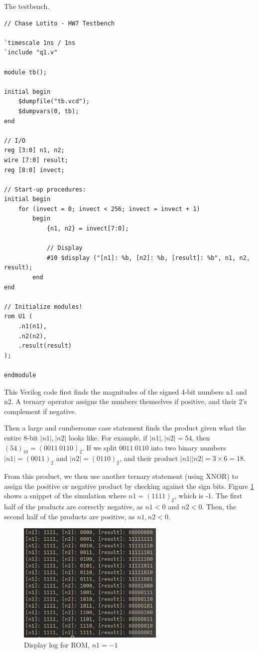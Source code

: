 \documentclass{article}
\begin{document}
The testbench.

\begin{lstlisting}
// Chase Lotito - HW7 Testbench

`timescale 1ns / 1ns
`include "q1.v"

module tb();
 
initial begin
    $dumpfile("tb.vcd");
    $dumpvars(0, tb);
end

// I/O
reg [3:0] n1, n2;
wire [7:0] result;
reg [8:0] invect;

// Start-up procedures:
initial begin  
    for (invect = 0; invect < 256; invect = invect + 1)
        begin
            {n1, n2} = invect[7:0];
            
            // Display 
            #10 $display ("[n1]: %b, [n2]: %b, [result]: %b", n1, n2, result);
        end
end

// Initialize modules!
rom U1 (
    .n1(n1),
    .n2(n2),
    .result(result)
);

endmodule
\end{lstlisting}

This Verilog code first finds the magnitudes of the signed 4-bit numbers n1 and n2. A ternary operator assigns the numbers themselves if positive, and their 2's complement if negative.

\smallskip

Then a large and cumbersome case statement finds the product given what the entire 8-bit \({|n1|, |n2|}\) looks like. For example, if \({|n1|, |n2|} = 54\), then \((54)_{10} = (0011 ~ 0110)_{2}\). If we split \(0011 ~ 0110\) into two binary numbers \(|n1| = (0011)_{2}\) and \(|n2| = (0110)_{2}\), and their product \(|n1||n2| = 3 \times 6 = 18\). 

\smallskip

From this product, we then use another ternary statement (using XNOR) to assign the positive or negative product by checking against the sign bits. Figure \ref{fig:simlog} shows a snippet of the simulation where \(n1 = (1111)_{2}\), which is -1. The first half of the products are correctly negative, as \(n1 < 0\) and \(n2 < 0\). Then, the second half of the products are positive, as \(n1, n2 < 0\).  

\begin{figure}[!ht] 
    \centering
    \includegraphics[width = 7cm]{426hw7log.png}
    \caption{Display log for ROM, \(n1 = -1\)}
    \label{fig:simlog}
\end{figure}
\end{document}
